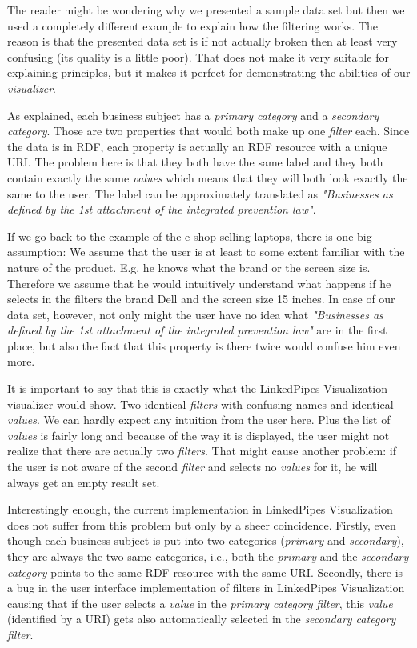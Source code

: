 The reader might be wondering why we presented a sample data set but then we used a completely different example to explain how the filtering works. The reason is that the presented data set is if not actually broken then at least very confusing (its quality is a little poor). That does not make it very suitable for explaining principles, but it makes it perfect for demonstrating the abilities of our \emph{visualizer}.

As explained, each business subject has a \emph{primary category} and a \emph{secondary category}. Those are two properties that would both make up one \emph{filter} each. Since the data is in RDF, each property is actually an RDF resource with a unique URI. The problem here is that they both have the same label and they both contain exactly the same \emph{values} which means that they will both look exactly the same to the user. The label can be approximately translated as \textit{"Businesses as defined by the 1st attachment of the integrated prevention law"}.

If we go back to the example of the e-shop selling laptops, there is one big assumption: We assume that the user is at least to some extent familiar with the nature of the product. E.g. he knows what the brand or the screen size is. Therefore we assume that he would intuitively understand what happens if he selects in the filters the brand Dell and the screen size 15 inches. In case of our data set, however, not only might the user have no idea what \textit{"Businesses as defined by the 1st attachment of the integrated prevention law"} are in the first place, but also the fact that this property is there twice would confuse him even more. 

It is important to say that this is exactly what the LinkedPipes Visualization visualizer would show. Two identical \emph{filters} with confusing names and identical \emph{values}. We can hardly expect any intuition from the user here. Plus the list of \emph{values} is fairly long and because of the way it is displayed, the user might not realize that there are actually two \emph{filters}. That might cause another problem: if the user is not aware of the second \emph{filter} and selects no \emph{values} for it, he will always get an empty result set.

Interestingly enough, the current implementation in LinkedPipes Visualization does not suffer from this problem but only by a sheer coincidence. Firstly, even though each business subject is put into two categories (\emph{primary} and \emph{secondary}), they are always the two same categories, i.e., both the \emph{primary} and the \emph{secondary category} points to the same RDF resource with the same URI. Secondly, there is a bug in the  user interface implementation of filters in LinkedPipes Visualization causing that if the user selects a \emph{value} in the \emph{primary category} \emph{filter}, this \emph{value} (identified by a URI) gets also automatically selected in the \emph{secondary category} \emph{filter}.

